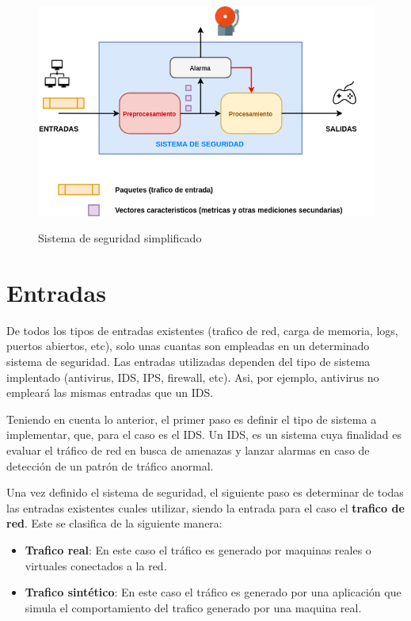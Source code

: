 \documentclass[12pt]{article}
\begin{document}
\begin{figure}[htbp]
\begin{center}
\includegraphics[scale=0.5]{sistema_simplificado2.png}\\[1cm] %
\caption{Sistema de seguridad simplificado}
\end{center}
\end{figure}

\section{Entradas}

De todos los tipos de entradas existentes (trafico de red, carga de
memoria, logs, puertos abiertos, etc), solo unas cuantas son empleadas
en un determinado sistema de seguridad. Las entradas utilizadas
dependen del tipo de sistema implentado (antivirus, IDS, IPS,
firewall, etc). Asi, por ejemplo, antivirus no empleará las mismas
entradas que un IDS.

Teniendo en cuenta lo anterior, el primer paso es definir el tipo de
sistema a implementar, que, para el caso es el IDS. Un IDS, es un
sistema cuya finalidad es evaluar el tráfico de red en busca de
amenazas y lanzar alarmas en caso de detección de un patrón de tráfico
anormal.

Una vez definido el sistema de seguridad, el siguiente paso es
determinar de todas las entradas existentes cuales utilizar, siendo la
entrada para el caso el \textbf{trafico de red}. Este se clasifica de
la siguiente manera:
\begin{itemize}
\item \textbf{Trafico real}: En este caso el tráfico es generado por
  maquinas reales o virtuales conectados a la red.
\item \textbf{Trafico sintético}: En este caso el tráfico es generado
  por una aplicación que simula el comportamiento del trafico generado
  por una maquina real.
\end{itemize}
\end{document}
